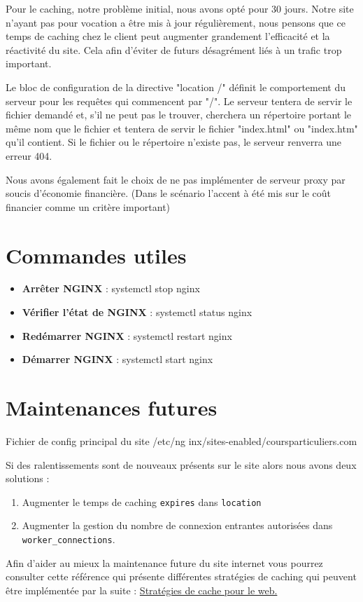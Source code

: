 \documentclass{article}
\begin{document}
Pour le caching, notre problème initial, nous avons opté pour 30 jours.
Notre site n'ayant pas pour vocation a être mis à jour régulièrement, nous pensons que ce temps de caching chez le client peut augmenter grandement l'efficacité et la réactivité du site. Cela afin d'éviter de futurs désagrément liés à un trafic trop important.

Le bloc de configuration de la directive "location /" définit le comportement du serveur pour les requêtes qui commencent par "/". Le serveur tentera de servir le fichier demandé et, s'il ne peut pas le trouver, cherchera un répertoire portant le même nom que le fichier et tentera de servir le fichier "index.html" ou "index.htm" qu'il contient. Si le fichier ou le répertoire n'existe pas, le serveur renverra une erreur 404.

Nous avons également fait le choix de ne pas implémenter de serveur proxy par soucis d'économie financière. (Dans le scénario l'accent à été mis sur le coût financier comme un critère important)

\section{Commandes utiles}

\begin{itemize}
    \item \textbf{Arrêter NGINX} :  systemctl stop nginx
    \item \textbf{Vérifier l'état de NGINX} :  systemctl status nginx
    \item \textbf{Redémarrer NGINX} :  systemctl restart nginx
    \item \textbf{Démarrer NGINX} :  systemctl start nginx
\end{itemize}

\section{Maintenances futures}


Fichier de config principal du site /etc/ng inx/sites-enabled/coursparticuliers.com

Si des ralentissements sont de nouveaux présents sur le site alors nous avons deux solutions : 
\begin{enumerate}
    \item Augmenter le temps de caching \texttt{expires} dans \texttt{location}
    \item  Augmenter la gestion du nombre de connexion entrantes autorisées dans \texttt{worker\_connections}.
\end{enumerate}

Afin d'aider au mieux la maintenance future du site internet vous pourrez consulter cette référence qui présente différentes stratégies de caching qui peuvent être implémentée par la suite : \href{https://www.youtube.com/watch?v=L3VC0za4heY&source_ve_path=Mjg2NjY}{Stratégies de cache pour le web.}
\end{document}
